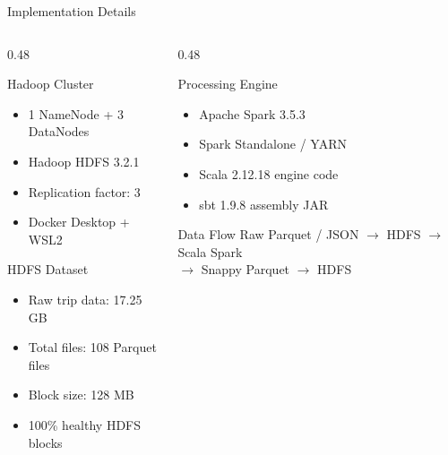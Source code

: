 \documentclass[aspectratio=169]{beamer}
\begin{document}
\begin{frame}{Implementation Details}
  \begin{columns}[T]
    \begin{column}{0.48\textwidth}
      \begin{block}{Hadoop Cluster}
        \begin{itemize}
          \item 1 NameNode + 3 DataNodes
          \item Hadoop HDFS 3.2.1
          \item Replication factor: 3
          \item Docker Desktop + WSL2
        \end{itemize}
      \end{block}
      \begin{block}{HDFS Dataset}
        \begin{itemize}
          \item Raw trip data: 17.25 GB
          \item Total files: 108 Parquet files
          \item Block size: 128 MB
          \item 100\% healthy HDFS blocks
        \end{itemize}
      \end{block}
    \end{column}
    \begin{column}{0.48\textwidth}
      \begin{block}{Processing Engine}
        \begin{itemize}
          \item Apache Spark 3.5.3
          \item Spark Standalone / YARN
          \item Scala 2.12.18 engine code
          \item sbt 1.9.8 assembly JAR
        \end{itemize}
      \end{block}
      \begin{block}{Data Flow}
        \centering \scriptsize
        Raw Parquet / JSON $\rightarrow$ HDFS $\rightarrow$ Scala Spark\\[2pt]
        $\rightarrow$ Snappy Parquet $\rightarrow$ HDFS
      \end{block}
    \end{column}
  \end{columns}
\end{frame}
\end{document}
